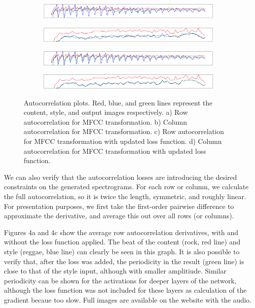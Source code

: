 \documentclass{article}
\begin{document}
\begin{figure}[!h]
\begin{subfigure}{\textwidth}
  \centering
  \includegraphics[width = \textwidth]{row_ac_mfcc_input}
  \caption{}
\end{subfigure}
\begin{subfigure}{\textwidth}
  \centering
  \includegraphics[width = \textwidth]{col_ac_mfcc_input}
  \caption{}
\end{subfigure}
\begin{subfigure}{\textwidth}
  \centering
  \includegraphics[width = \textwidth]{row_ac_input}
  \caption{}
\end{subfigure}
\begin{subfigure}{\textwidth}
  \centering
  \includegraphics[width = \textwidth]{col_ac_input}
  \caption{}
\end{subfigure}
\caption{Autocorrelation plots. Red, blue, and green lines represent the content, style, and output images respectively. a) Row autocorrelation for MFCC transformation. b) Column autocorrelation for MFCC transformation. c) Row autocorrelation for MFCC transformation with updated loss function. d) Column autocorrelation for MFCC transformation with updated loss function.}
\end{figure}

We can also verify that the autocorrelation losses are introducing the desired constraints on the generated spectrograms. For each row or column, we calculate the full autocorrelation, so it is twice the length, symmetric, and roughly linear. For presentation purposes, we first take the first-order pairwise difference to approximate the derivative, and average this out over all rows (or columns).

Figures 4a and 4c show the average row autocorrelation derivatives, with and without the loss function applied. The beat of the content (rock, red line) and style (reggae, blue line) can clearly be seen in this graph. It is also possible to verify that, after the loss was added, the periodicity in the result (green line) is close to that of the style input, although with smaller amplitiude. Similar periodicity can be shown for the activations for deeper layers of the network, although the loss function was not included for these layers as calculation of the gradient becaue too slow. Full images are available on the website with the audio.
\end{document}
